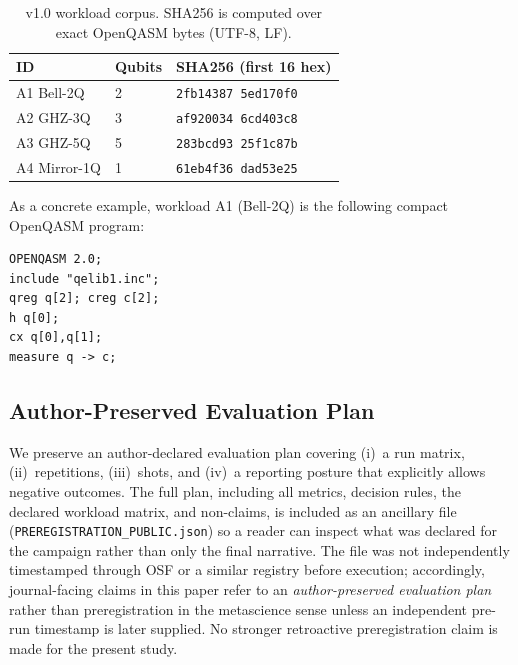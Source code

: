 \documentclass[aps,prxquantum,twocolumn,superscriptaddress,amsmath,amssymb,longbibliography,floatfix]{revtex4-2}
\begin{document}
\begin{table}[t]
\caption{v1.0 workload corpus. SHA256 is computed over exact OpenQASM bytes (UTF-8, LF).}
\label{tab:corpus_v10}
\begin{ruledtabular}
\begin{tabular}{llp{3.2cm}}
ID & Qubits & SHA256 (first 16 hex) \\
\hline
A1 Bell-2Q   & 2 & \texttt{2fb14387 5ed170f0} \\
A2 GHZ-3Q    & 3 & \texttt{af920034 6cd403c8} \\
A3 GHZ-5Q    & 5 & \texttt{283bcd93 25f1c87b} \\
A4 Mirror-1Q & 1 & \texttt{61eb4f36 dad53e25} \\
\end{tabular}
\end{ruledtabular}
\end{table}

\noindent\begin{minipage}{\columnwidth}
As a concrete example, workload A1 (Bell-2Q) is the following compact OpenQASM program:
\begin{lstlisting}
OPENQASM 2.0;
include "qelib1.inc";
qreg q[2]; creg c[2];
h q[0];
cx q[0],q[1];
measure q -> c;
\end{lstlisting}
\end{minipage}

\subsection{Author-Preserved Evaluation Plan}
\label{sec:prereg}

We preserve an author-declared evaluation plan covering (i)~a run matrix, (ii)~repetitions, (iii)~shots, and (iv)~a reporting posture that explicitly allows negative outcomes. The full plan, including all metrics, decision rules, the declared workload matrix, and non-claims, is included as an ancillary file (\texttt{PREREGISTRATION\_PUBLIC.json}) so a reader can inspect what was declared for the campaign rather than only the final narrative. The file was not independently timestamped through OSF or a similar registry before execution; accordingly, journal-facing claims in this paper refer to an \emph{author-preserved evaluation plan} rather than preregistration in the metascience sense unless an independent pre-run timestamp is later supplied. No stronger retroactive preregistration claim is made for the present study.
\end{document}
